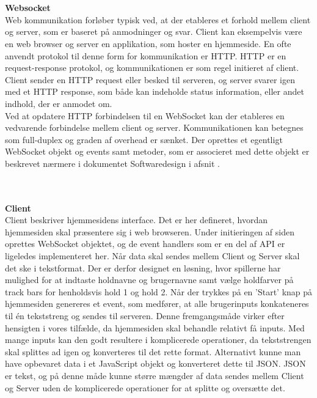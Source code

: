 \documentclass[Rapport/Rapport_main.tex]{subfiles}
\begin{document}
\\\\\textbf{Websocket}
\\Web kommunikation forløber typisk ved, at der etableres et forhold mellem client og server, som er baseret på anmodninger og svar. Client kan eksempelvis være en web browser og server en applikation, som hoster en hjemmeside. En ofte anvendt protokol til denne form for kommunikation er HTTP.\cite{http_wiki} HTTP er en request-response protokol, og kommunikationen er som regel initieret af client. Client sender en HTTP request eller besked til serveren, og server svarer igen med et HTTP response, som både kan indeholde status information, eller andet indhold, der er anmodet om. \\Ved at opdatere HTTP forbindelsen til en WebSocket kan der etableres en vedvarende forbindelse mellem client og server. Kommunikationen kan betegnes som full-duplex og graden af overhead er sænket.\cite{websocket_wiki} Der oprettes et egentligt WebSocket objekt og events samt metoder, som er associeret med dette objekt er beskrevet nærmere i dokumentet Softwaredesign i afsnit .

\\\\\textbf{Client}
\\Client beskriver hjemmesidens interface. Det er her defineret, hvordan hjemmesiden skal præsentere sig i web browseren. Under initieringen af siden oprettes WebSocket objektet, og de event handlers som er en del af API er ligeledes implementeret her. Når data skal sendes mellem Client og Server skal det ske i tekstformat. Der er derfor designet en løsning, hvor spillerne har mulighed for at indtaste holdnavne og brugernavne samt vælge holdfarver på track bars for henholdsvis hold 1 og hold 2. Når der trykkes på en 'Start' knap på hjemmesiden genereres et event, som medfører, at alle brugerinputs konkateneres til én tekststreng og sendes til serveren. Denne fremgangsmåde virker efter hensigten i vores tilfælde, da hjemmesiden skal behandle relativt få inputs. Med mange inputs kan den godt resultere i komplicerede operationer, da tekststrengen skal splittes ad igen og konverteres til det rette format. Alternativt kunne man have opbevaret data i et JavaScript objekt og konverteret dette til JSON.\cite{json_intro} JSON er tekst, og på denne måde kunne større mængder af data sendes mellem Client og Server uden de komplicerede operationer for at splitte og oversætte det.
\end{document}
